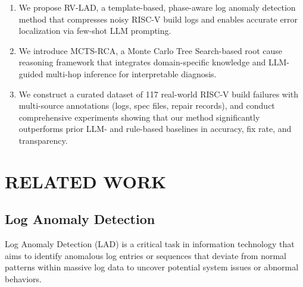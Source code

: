 \documentclass[10pt,conference]{IEEEtran}
\begin{document}
\begin{enumerate}
\item 

We propose RV-LAD, a template-based, phase-aware log anomaly detection method that compresses noisy RISC-V build logs and enables accurate error localization via few-shot LLM prompting.
    
\item We introduce MCTS-RCA, a Monte Carlo Tree Search-based root cause reasoning framework that integrates domain-specific knowledge and LLM-guided multi-hop inference for interpretable diagnosis.
    
\item We construct a curated dataset of 117 real-world RISC-V build failures with multi-source annotations (logs, spec files, repair records), and conduct comprehensive experiments showing that our method significantly outperforms prior LLM- and rule-based baselines in accuracy, fix rate, and transparency.

\end{enumerate}

\section{RELATED WORK}

\subsection{Log Anomaly Detection}

Log Anomaly Detection (LAD) is a critical task in information technology\cite{r5,r6} that aims to identify anomalous log entries or sequences that deviate from normal patterns within massive log data to uncover potential system issues or abnormal behaviors.
\end{document}

